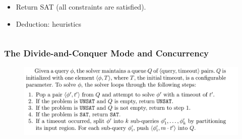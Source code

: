 \documentclass[aspectratio=169%
,serif,mathserif]{beamer}
\begin{document}
\begin{frame}
\begin{columns}
\begin{column}{.6\textwidth}
\begin{itemize}
				\item  Return SAT (all constraints are satisfied).
				\item  Deduction: heuristics
			\end{itemize}
		\end{column}

	\end{columns}
\end{frame}



\begin{frame}
	\frametitle{The Divide-and-Conquer Mode and Concurrency}
	\begin{figure}[htbp]
		\includegraphics[width=1\linewidth]{6.png}
	\end{figure}
\end{frame}








\begin{frame}
\hfill
{}
\linespread{3}\selectfont
\end{frame}
\end{document}

